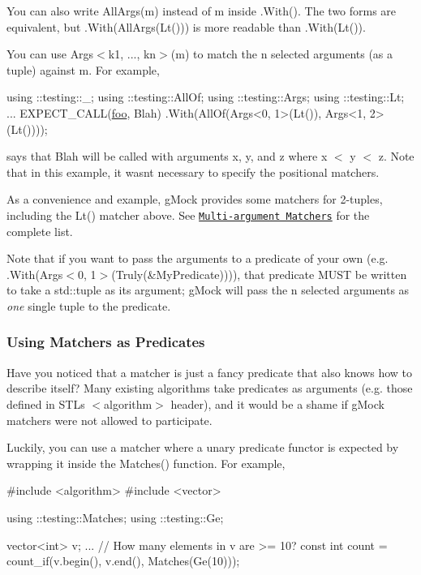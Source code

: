 You can also write {\ttfamily All\+Args(m)} instead of {\ttfamily m} inside {\ttfamily .With()}. The two forms are equivalent, but {\ttfamily .With(All\+Args(\+Lt()))} is more readable than {\ttfamily .With(\+Lt())}.

You can use {\ttfamily Args$<$k1, ..., kn$>$(m)} to match the {\ttfamily n} selected arguments (as a tuple) against {\ttfamily m}. For example,


\begin{DoxyCode}
using ::testing::\_;
using ::testing::AllOf;
using ::testing::Args;
using ::testing::Lt;
...
  EXPECT\_CALL(\mbox{\hyperlink{namespacefoo}{foo}}, Blah)
      .With(AllOf(Args<0, 1>(Lt()), Args<1, 2>(Lt())));
\end{DoxyCode}


says that {\ttfamily Blah} will be called with arguments {\ttfamily x}, {\ttfamily y}, and {\ttfamily z} where {\ttfamily x $<$ y $<$ z}. Note that in this example, it wasn\textquotesingle{}t necessary to specify the positional matchers.

As a convenience and example, g\+Mock provides some matchers for 2-\/tuples, including the {\ttfamily Lt()} matcher above. See \href{reference/matchers.md#MultiArgMatchers}{\tt Multi-\/argument Matchers} for the complete list.

Note that if you want to pass the arguments to a predicate of your own (e.\+g. {\ttfamily .With(Args$<$0, 1$>$(Truly(\&\+My\+Predicate)))}), that predicate M\+U\+ST be written to take a {\ttfamily std\+::tuple} as its argument; g\+Mock will pass the {\ttfamily n} selected arguments as {\itshape one} single tuple to the predicate.

\subsubsection*{Using Matchers as Predicates}

Have you noticed that a matcher is just a fancy predicate that also knows how to describe itself? Many existing algorithms take predicates as arguments (e.\+g. those defined in S\+TL\textquotesingle{}s {\ttfamily $<$algorithm$>$} header), and it would be a shame if g\+Mock matchers were not allowed to participate.

Luckily, you can use a matcher where a unary predicate functor is expected by wrapping it inside the {\ttfamily Matches()} function. For example,


\begin{DoxyCode}
\textcolor{preprocessor}{#include <algorithm>}
\textcolor{preprocessor}{#include <vector>}

using ::testing::Matches;
using ::testing::Ge;

vector<int> v;
...
\textcolor{comment}{// How many elements in v are >= 10?}
const \textcolor{keywordtype}{int} count = count\_if(v.begin(), v.end(), Matches(Ge(10)));
\end{DoxyCode}


